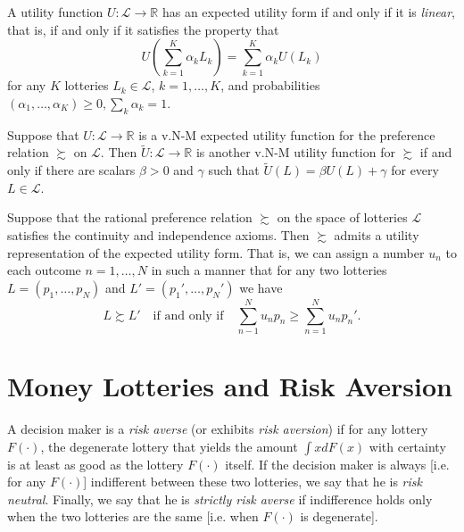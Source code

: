 \begin{prop}
    A utility function $U : \mathscr{L} \to \mathbb{R}$ has an expected utility form if and only if it is \emph{linear}, that is, if and only if it satisfies the property that
    \begin{equation*}
        U \left( \sum_{k = 1}^K \alpha_k L_k \right) = \sum_{k = 1}^K \alpha_k U(L_k)
    \end{equation*}
    for any $K$ lotteries $L_k \in \mathscr{L}$, $k = 1, \dots, K$, and probabilities $(\alpha_1, \dots, \alpha_K) \geq 0, \sum_k \alpha_k = 1$.
\end{prop}

\begin{prop}
    Suppose that $U : \mathscr{L} \to \mathbb{R}$ is a v.N-M expected utility function for the preference relation $\succsim$ on $\mathscr{L}$. Then $\tilde{U} : \mathscr{L} \to \mathbb{R}$ is another v.N-M utility function for $\succsim$ if and only if there are scalars $\beta > 0$ and $\gamma$ such that $\tilde{U}(L) = \beta U(L) + \gamma$ for every $L \in \mathscr{L}$.
\end{prop}

\begin{prop}
    Suppose that the rational preference relation $\succsim$ on the space of lotteries $\mathscr{L}$ satisfies the continuity and independence axioms. Then $\succsim$ admits a utility representation of the expected utility form. That is, we can assign a number $u_n$ to each outcome $n = 1, \dots, N$ in such a manner that for any two lotteries $L = (p_1, \dots, p_N)$ and $L' = (p_1', \dots, p_N')$ we have
    \begin{equation*}
        L \succsim L' \quad \text{if and only if} \quad \sum_{n - 1}^N u_n p _n \geq \sum_{n = 1}^N u_n p_n'.
    \end{equation*}
\end{prop}


\section{Money Lotteries and Risk Aversion}

\begin{defn}
    A decision maker is a \emph{risk averse} (or exhibits \emph{risk aversion}) if for any lottery $F(\cdot)$, the degenerate lottery that yields the amount $\int x dF(x)$ with certainty is at least as good as the lottery $F(\cdot)$ itself. If the decision maker is always [i.e. for any $F(\cdot)$] indifferent between these two lotteries, we say that he is \emph{risk neutral}. Finally, we say that he is \emph{strictly risk averse} if indifference holds only when the two lotteries are the same [i.e. when $F(\cdot)$ is degenerate].
\end{defn}

